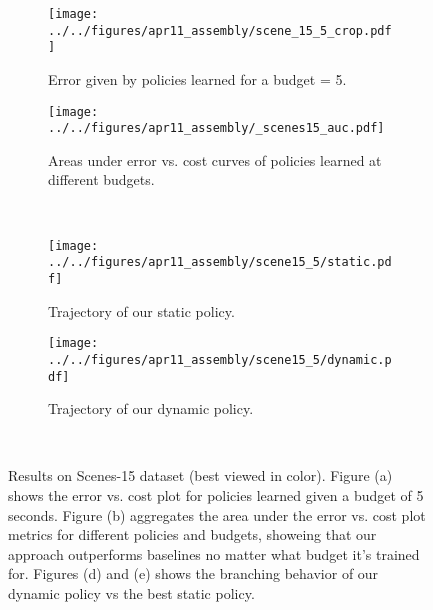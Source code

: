 \begin{figure*}[ht]
\centering
    \centering
    \begin{subfigure}[b]{0.5\textwidth}
            \texttt{[image: ../../figures/apr11\_assembly/scene\_15\_5\_crop.pdf]}
            \caption{Error given by policies learned for a budget = 5.}
    \end{subfigure}%
    \begin{subfigure}[b]{0.44\textwidth}
            \texttt{[image: ../../figures/apr11\_assembly/\_scenes15\_auc.pdf]}
            \caption{Areas under error vs. cost curves of policies learned at different budgets.}
    \end{subfigure}\\
    \begin{subfigure}[b]{0.47\textwidth}
            \texttt{[image: ../../figures/apr11\_assembly/scene15\_5/static.pdf]}
            \caption{Trajectory of our static policy.}
    \end{subfigure}%
    \begin{subfigure}[b]{0.47\textwidth}
            \texttt{[image: ../../figures/apr11\_assembly/scene15\_5/dynamic.pdf]}
            \caption{Trajectory of our dynamic policy.}
    \end{subfigure}\\
    \caption[Results of the classification approach on the Scenes-15 dataset.]{
Results on Scenes-15 dataset (best viewed in color).
Figure (a) shows the error vs. cost plot for policies learned given a budget of 5 seconds.
Figure (b) aggregates the area under the error vs. cost plot metrics for different policies and budgets, showeing that our approach outperforms baselines no matter what budget it's trained for.
Figures (d) and (e) shows the branching behavior of our dynamic policy vs the best static policy.
}\label{fig:clf_scenes}
\end{figure*}
